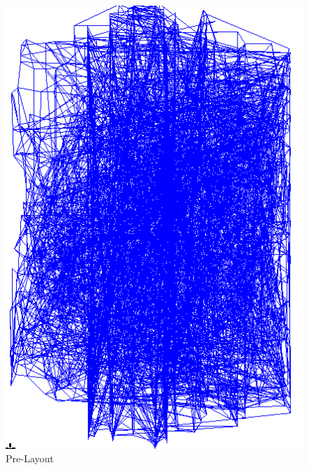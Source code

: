 \documentclass[11pt]{article}
\begin{document}
		\begin{figure}[H] 
			\centering 
			\includegraphics[width=\textwidth,height=\dimexpr\textheight-4\baselineskip-\abovecaptionskip-\belowcaptionskip\relax,keepaspectratio]{"Pictures/Pre-Layout"}
			\caption{Pre-Layout} 
			\label{fig:Pre-Layout} 
		\end{figure}
	
\end{document}
